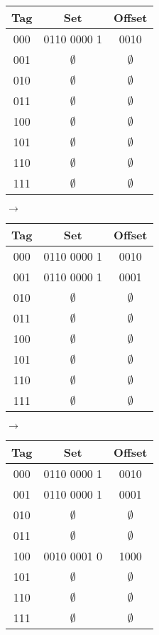 \documentclass{exam}
\begin{document}
\begin{questions}
\begin{tabular}{c|c|c}
\textbf{Tag}&\textbf{Set}&\textbf{Offset}\\ [0.5ex] 
 \hline\hline
000&0110 0000 1&0010\\
001&$\emptyset$&$\emptyset$\\
010&$\emptyset$&$\emptyset$\\
011&$\emptyset$&$\emptyset$\\
100&$\emptyset$&$\emptyset$\\
101&$\emptyset$&$\emptyset$\\
110&$\emptyset$&$\emptyset$\\
111&$\emptyset$&$\emptyset$
\end{tabular} $\longrightarrow$
\begin{tabular}{c|c|c}
\textbf{Tag}&\textbf{Set}&\textbf{Offset}\\ [0.5ex] 
 \hline\hline
000&0110 0000 1&0010\\
001&0110 0000 1&0001\\
010&$\emptyset$&$\emptyset$\\
011&$\emptyset$&$\emptyset$\\
100&$\emptyset$&$\emptyset$\\
101&$\emptyset$&$\emptyset$\\
110&$\emptyset$&$\emptyset$\\
111&$\emptyset$&$\emptyset$
\end{tabular} $\longrightarrow$
\begin{tabular}{c|c|c}
\textbf{Tag}&\textbf{Set}&\textbf{Offset}\\ [0.5ex] 
 \hline\hline
000&0110 0000 1&0010\\
001&0110 0000 1&0001\\
010&$\emptyset$&$\emptyset$\\
011&$\emptyset$&$\emptyset$\\
100&0010 0001 0 &1000\\
101&$\emptyset$&$\emptyset$\\
110&$\emptyset$&$\emptyset$\\
111&$\emptyset$&$\emptyset$
\end{tabular}


\end{questions}
\end{document}

